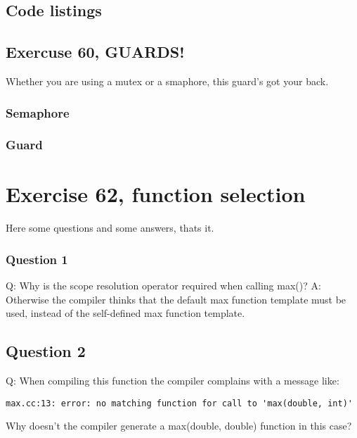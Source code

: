 \documentclass[11pt]{article}
\begin{document}
\subsection*{Code listings}

\subsection*{Exercuse 60, GUARDS!}
Whether you are using a mutex or a smaphore, this guard's got your back.





\subsubsection*{Semaphore}




\subsubsection*{Guard}





\section*{Exercise 62, function selection}
Here some questions and some answers, thats it.
\subsubsection*{Question 1}
Q: Why is the scope resolution operator required when calling max()?
A: Otherwise the compiler thinks that the default max function template must be used, instead of the self-defined max function template.

\subsection*{Question 2}
Q: When compiling this function the compiler complains with a message like:
\begin{lstlisting}
max.cc:13: error: no matching function for call to 'max(double, int)'
\end{lstlisting}
Why doesn't the compiler generate a max(double, double) function in this case? 
\end{document}
